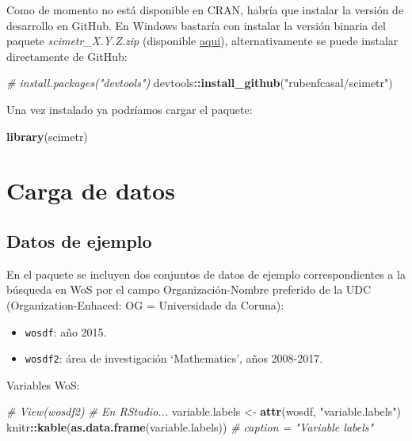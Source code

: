 \documentclass[]{book}
\newenvironment{Shaded}{\begin{snugshade}}{\end{snugshade}}
\newcommand{\CommentTok}[1]{\textcolor[rgb]{0.56,0.35,0.01}{\textit{#1}}}
\newcommand{\KeywordTok}[1]{\textcolor[rgb]{0.13,0.29,0.53}{\textbf{#1}}}
\newcommand{\NormalTok}[1]{#1}
\newcommand{\OperatorTok}[1]{\textcolor[rgb]{0.81,0.36,0.00}{\textbf{#1}}}
\newcommand{\StringTok}[1]{\textcolor[rgb]{0.31,0.60,0.02}{#1}}
\begin{document}
Como de momento no está disponible en CRAN,
habría que instalar la versión de desarrollo en GitHub.
En Windows bastaría con instalar la versión binaria del paquete \emph{scimetr\_X.Y.Z.zip}
(disponible \href{https://github.com/rubenfcasal/scimetr/tree/master/docs}{aqui}),
alternativamente se puede instalar directamente de GitHub:

\begin{Shaded}
\begin{Highlighting}[]
\CommentTok{# install.packages("devtools")}
\NormalTok{devtools}\OperatorTok{::}\KeywordTok{install_github}\NormalTok{(}\StringTok{"rubenfcasal/scimetr"}\NormalTok{)}
\end{Highlighting}
\end{Shaded}

Una vez instalado ya podríamos cargar el paquete:

\begin{Shaded}
\begin{Highlighting}[]
\KeywordTok{library}\NormalTok{(scimetr)}
\end{Highlighting}
\end{Shaded}

\hypertarget{carga-de-datos}{%
\section{Carga de datos}\label{carga-de-datos}}

\hypertarget{datos-de-ejemplo-1}{%
\subsection{Datos de ejemplo}\label{datos-de-ejemplo-1}}

En el paquete se incluyen dos conjuntos de datos de ejemplo
correspondientes a la búsqueda en WoS
por el campo Organización-Nombre preferido de la UDC
(Organization-Enhaced: OG = Universidade da Coruna):

\begin{itemize}
\item
  \texttt{wosdf}: año 2015.
\item
  \texttt{wosdf2}: área de investigación `Mathematics', años 2008-2017.
\end{itemize}

Variables WoS:

\begin{Shaded}
\begin{Highlighting}[]
\CommentTok{# View(wosdf2) # En RStudio...}
\NormalTok{variable.labels <-}\StringTok{ }\KeywordTok{attr}\NormalTok{(wosdf, }\StringTok{"variable.labels"}\NormalTok{)}
\NormalTok{knitr}\OperatorTok{::}\KeywordTok{kable}\NormalTok{(}\KeywordTok{as.data.frame}\NormalTok{(variable.labels)) }\CommentTok{# caption = "Variable labels"}
\end{Highlighting}
\end{Shaded}
\end{document}

